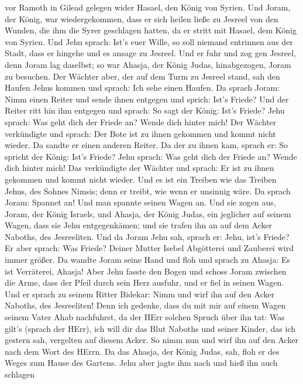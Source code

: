 vor Ramoth in Gilead gelegen wider Hasael, den König von Syrien.
 Und Joram, der König, war wiedergekommen, dass er sich
heilen ließe zu Jesreel von den Wunden, die ihm die Syrer geschlagen
hatten, da er stritt mit Hasael, dem König von Syrien. Und Jehu sprach:
Ist's euer Wille, so soll niemand entrinnen aus der Stadt, dass er
hingehe und es ansage zu Jesreel.  Und er fuhr und zog gen
Jesreel, denn Joram lag daselbst; so war Ahasja, der König Judas,
hinabgezogen, Joram zu besuchen.  Der Wächter aber, der auf
dem Turm zu Jesreel stand, sah den Haufen Jehus kommen und sprach: Ich
sehe einen Haufen. Da sprach Joram: Nimm einen Reiter und sende ihnen
entgegen und sprich: Ist's Friede?  Und der Reiter ritt hin
ihm entgegen und sprach: So sagt der König: Ist's Friede? Jehu sprach:
Was geht dich der Friede an? Wende dich hinter mich! Der Wächter
verkündigte und sprach: Der Bote ist zu ihnen gekommen und kommt nicht
wieder.  Da sandte er einen anderen Reiter. Da der zu ihnen
kam, sprach er: So spricht der König: Ist's Friede? Jehu sprach: Was
geht dich der Friede an? Wende dich hinter mich!  Das
verkündigte der Wächter und sprach: Er ist zu ihnen gekommen und kommt
nicht wieder. Und es ist ein Treiben wie das Treiben Jehus, des Sohnes
Nimsis; denn er treibt, wie wenn er unsinnig wäre.  Da
sprach Joram: Spannet an! Und man spannte seinen Wagen an. Und sie zogen
aus, Joram, der König Israels, und Ahasja, der König Judas, ein
jeglicher auf seinem Wagen, dass sie Jehu entgegenkämen; und sie trafen
ihn an auf dem Acker Naboths, des Jesreeliten.  Und da
Joram Jehu sah, sprach er: Jehu, ist's Friede? Er aber sprach: Was
Friede? Deiner Mutter Isebel Abgötterei und Zauberei wird immer größer.
 Da wandte Joram seine Hand und floh und sprach zu Ahasja:
Es ist Verräterei, Ahasja!  Aber Jehu fasste den Bogen und
schoss Joram zwischen die Arme, dass der Pfeil durch sein Herz ausfuhr,
und er fiel in seinen Wagen.  Und er sprach zu seinem
Ritter Bidekar: Nimm und wirf ihn auf den Acker Naboths, des
Jesreeliten! Denn ich gedenke, dass du mit mir auf einem Wagen seinem
Vater Ahab nachfuhrst, da der HErr solchen Spruch über ihn tat:
 Was gilt's (sprach der HErr), ich will dir das Blut
Naboths und seiner Kinder, das ich gestern sah, vergelten auf diesem
Acker. So nimm nun und wirf ihn auf den Acker nach dem Wort des HErrn.
 Da das Ahasja, der König Judas, sah, floh er des Weges zum
Hause des Gartens. Jehu aber jagte ihm nach und hieß ihn auch schlagen
